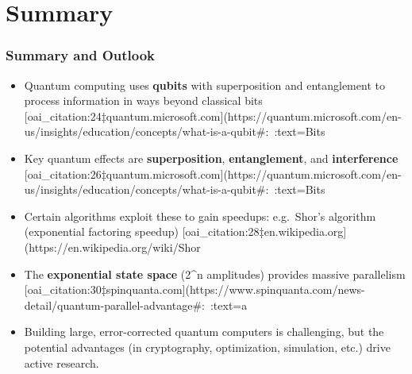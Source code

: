 \documentclass{beamer}
\begin{document}
\section{Summary}
\begin{frame}
\frametitle{Summary and Outlook}
\begin{itemize}
  \item Quantum computing uses {\bf qubits} with superposition and entanglement to process information in ways beyond classical bits [oai_citation:24‡quantum.microsoft.com](https://quantum.microsoft.com/en-us/insights/education/concepts/what-is-a-qubit#:~:text=Bits%
  \item Key quantum effects are {\bf superposition}, {\bf entanglement}, and {\bf interference} [oai_citation:26‡quantum.microsoft.com](https://quantum.microsoft.com/en-us/insights/education/concepts/what-is-a-qubit#:~:text=Bits%
  \item Certain algorithms exploit these to gain speedups: e.g.\ Shor's algorithm (exponential factoring speedup) [oai_citation:28‡en.wikipedia.org](https://en.wikipedia.org/wiki/Shor%
  \item The {\bf exponential state space} (2^n amplitudes) provides massive parallelism [oai_citation:30‡spinquanta.com](https://www.spinquanta.com/news-detail/quantum-parallel-advantage#:~:text=a%
  \item Building large, error-corrected quantum computers is challenging, but the potential advantages (in cryptography, optimization, simulation, etc.) drive active research.
\end{itemize}
\end{frame}
\end{document}
